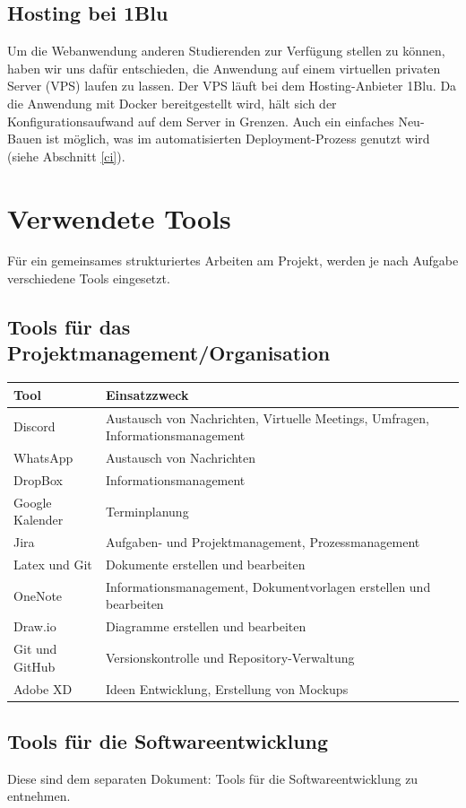 \documentclass[a4paper,11pt]{scrartcl}
\begin{document}
	\subsection{Hosting bei 1Blu}
Um die Webanwendung anderen Studierenden zur Verfügung stellen zu können, haben wir uns dafür entschieden, die Anwendung auf einem virtuellen privaten Server (VPS) laufen zu lassen. Der VPS läuft bei dem Hosting-Anbieter 1Blu. 
Da die Anwendung mit Docker bereitgestellt wird, hält sich der Konfigurationsaufwand auf dem Server in Grenzen. Auch ein einfaches Neu-Bauen ist möglich, was im automatisierten Deployment-Prozess genutzt wird (siehe Abschnitt \ref{ci}).

\section{Verwendete Tools}
Für ein gemeinsames strukturiertes Arbeiten am Projekt, werden je nach Aufgabe verschiedene Tools eingesetzt. 
	\subsection{Tools für das Projektmanagement/Organisation}
\begin{table}[H]
\begin{tabular}{|p{4cm}|p{8cm}|}
\hline
\textbf{Tool} &\textbf{Einsatzzweck} \\ \hline
Discord &  Austausch von Nachrichten, Virtuelle Meetings, Umfragen, Informationsmanagement\\ \hline
WhatsApp &  Austausch von Nachrichten\\ \hline
DropBox & Informationsmanagement \\ \hline
Google Kalender & Terminplanung   \\ \hline
Jira &  Aufgaben- und Projektmanagement, Prozessmanagement \\ \hline
Latex und Git &  Dokumente erstellen und bearbeiten \\ \hline
OneNote &  Informationsmanagement, Dokumentvorlagen erstellen und bearbeiten \\ \hline
Draw.io &  Diagramme erstellen und bearbeiten \\ \hline
Git und GitHub & Versionskontrolle und Repository-Verwaltung \\ \hline
Adobe XD & Ideen Entwicklung, Erstellung von Mockups \\ \hline
\end{tabular}
\end{table}
	\subsection{Tools für die Softwareentwicklung}
Diese sind dem separaten Dokument: \glqq Tools für die Softwareentwicklung\grqq{} zu entnehmen.
\end{document}
